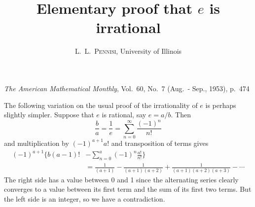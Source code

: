 \documentclass{article}
\title{Elementary proof that $e$ is irrational}
\author{L.\ L.\ \textsc{Pennisi}, University of Illinois}
\date{}
\begin{document}
	
\noindent
\emph{The American Mathematical Monthly}, Vol.\ 60, No.\ 7 (Aug.\ - Sep., 1953), p.\ 474

{\let\newpage\relax\maketitle}

\maketitle

The following variation on the usual proof of the irrationality of $e$ is perhaps slightly simpler. Suppose that $e$ is rational, say $e = a / b$. Then
\begin{equation*}
	\frac{b}{a} = \frac{1}{e} = \sum_{n=0}^{\infty} \frac{(-1)^{n}}{n !}
\end{equation*}
and multiplication by $(-1)^{a+1} a!$ and transposition of terms gives
\begin{equation*}
	\begin{aligned}
		(-1)^{a+1}\Bigg\{b(a-1) !&-\sum_{n=0}^{a} (-1)^{n} \frac{a !}{n !} \Bigg\} \\
		&=\frac{1}{(a+1)}-\frac{1}{(a+1)(a+2)}+\frac{1}{(a+1)(a+2)(a+3)}-\cdots
	\end{aligned}
\end{equation*}
The right side has a value between 0 and 1 since the alternating series clearly converges to a value between its first term and the sum of its first two terms. But the left side is an integer, so we have a contradiction.
\end{document}
